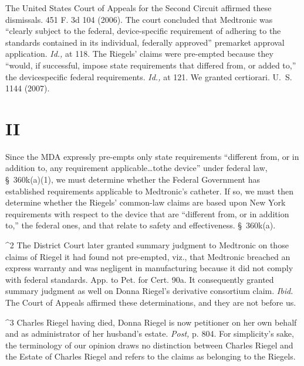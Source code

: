 {  The United States Court of Appeals for the Second Circuit affirmed
these dismissals. 451 F. 3d 104 (2006). The court concluded that
Medtronic was ``clearly subject to the federal, device-specific
requirement of adhering to the standards contained in its individual,
federally approved'' premarket approval application. \emph{Id.,} at
118. The Riegels' claims were pre-empted because they ``would,
if successful, impose state requirements that differed from, or added
to,'' the devicespecific federal requirements. \emph{Id.,} at 121. We
granted certiorari. U.~S. 1144 (2007).

\section{II}

  Since the MDA expressly pre-empts only state requirements ``different
from, or in addition to, any requirement applicable\dots tothe
device'' under federal law, \S~360k(a)(1), we must determine
whether the Federal Government has established requirements applicable
to Medtronic's catheter. If so, we must then determine whether
the Riegels' \newpage  common-law claims are based upon New York
requirements with respect to the device that are ``different from,
or in addition to,'' the federal ones, and that relate to safety and
effectiveness. \S~360k(a).

^2 The District Court later granted summary judgment to Medtronic on
those claims of Riegel it had found not pre-empted, viz., that Medtronic
breached an express warranty and was negligent in manufacturing because
it did not comply with federal standards. App. to Pet. for Cert. 90a.
It consequently granted summary judgment as well on Donna Riegel's
derivative consortium claim. \emph{Ibid.} The Court of Appeals affirmed
these determinations, and they are not before us.

^3 Charles Riegel having died, Donna Riegel is now petitioner on her own
behalf and as administrator of her husband's estate. \emph{Post,} p.
804. For simplicity's sake, the terminology of our opinion draws no
distinction between Charles Riegel and the Estate of Charles Riegel and
refers to the claims as belonging to the Riegels.

}
